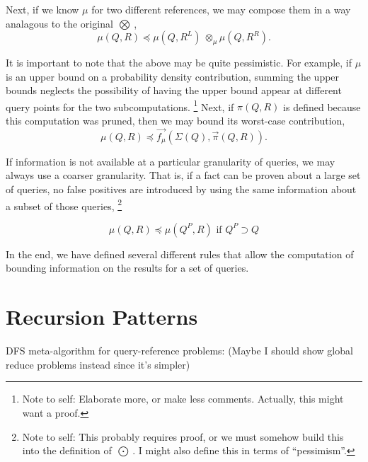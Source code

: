 \documentclass[times, leqno,twocolumn]{article}
\newcommand{\authornote}[1]{\footnote{Note to self: #1}}
\newcommand{\kdleft}[1]{#1^{\!L}}
\newcommand{\kdright}[1]{#1^{\!R}}
\newcommand{\kdparent}[1]{#1^{\!P}}
\newcommand{\myOp}[1]{\mathop{\bigotimes\nolimits\!\!_{#1}}}
\newcommand{\myop}[1]{{\scriptstyle\:}\otimes_{\!#1}}
\newcommand{\myOutop}[1]{\mathop{\bigodot\nolimits\!\!_{#1}}}
\newcommand{\letterqr}{\pi}
\newcommand{\Opqr}{\myOp{\letterqr}}
\newcommand{\inqrv}{\vec{\pi}}
\newcommand{\inmu}{\mu}
\newcommand{\Outopmu}{\myOutop{\mu}}
\newcommand{\opmu}{\myop{\mu}}
\newcommand{\fmuv}{\vec{f_{\mu}}}
\newcommand{\allowmu}{\preceq}
\newcommand{\outstat}{\Sigma}
\begin{document}
\noindent Next, if we know $\inmu$ for two different references, we may compose them in a way analagous to the original $\Opqr$,
\begin{equation}
\inmu(Q, R) \allowmu \inmu(Q, \kdleft{R}) \opmu \inmu(Q, \kdright{R}).
\label{eqn:combinemu}
\end{equation}

\noindent It is important to note that the above may be quite pessimistic.
For example, if $\inmu$ is an upper bound on a probability density contribution, summing the upper bounds neglects the possibility of having the upper bound appear at different query points for the two subcomputations.
\authornote{Elaborate more, or make less comments.  Actually, this might want a proof.}
Next, if $\pi(Q, R)$ is defined because this computation was pruned, then we may bound its worst-case contribution,
\begin{equation}
\inmu(Q, R) \allowmu \fmuv(\outstat(Q), \inqrv(Q, R)).
\label{eqn:pimu}
\end{equation}

\noindent 
If information is not available at a particular granularity of queries, we may always use a coarser granularity.
That is, if a fact can be proven about a large set of queries, no false positives are introduced by using the same information about a subset of those queries,
\authornote{This probably requires proof, or we must somehow build this into the definition of $\Outopmu$.  I might also define this in terms of ``pessimism''.}

\begin{equation}
\inmu(Q, R) \allowmu \inmu(\kdparent{Q}, R) \text{ if } \kdparent{Q} \supset Q
\end{equation}

\noindent In the end, we have defined several different rules that allow the computation of bounding information on the results for a set of queries.

\section{Recursion Patterns}

DFS meta-algorithm for query-reference problems:
(Maybe I should show global reduce problems instead since it's simpler)
\end{document}
